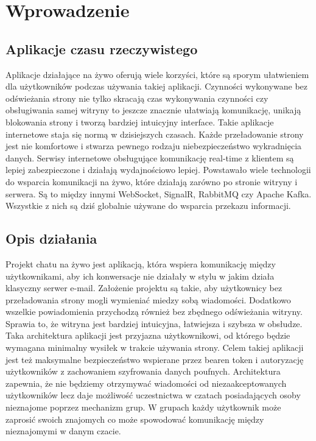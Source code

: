 \documentclass[10pt,a4paper]{article}
\begin{document}
\section{Wprowadzenie} 

\subsection{Aplikacje czasu rzeczywistego}
\hspace*{0.7cm} Aplikacje działające na żywo oferują wiele korzyści, które są sporym ułatwieniem dla użytkowników podczas używania takiej aplikacji. Czynności wykonywane
bez odświeżania strony nie tylko skracają czas wykonywania czynności czy obsługiwania samej witryny to jeszcze znacznie ułatwiają komunikację, unikają 
blokowania strony i tworzą bardziej intuicyjny interface. Takie aplikacje internetowe staja się normą w dzisiejszych czasach. Każde przeładowanie strony jest
nie komfortowe i stwarza pewnego rodzaju niebezpieczeństwo wykradnięcia danych. Serwisy internetowe obsługujące komunikację real-time z klientem są lepiej 
zabezpieczone i działają wydajnościowo lepiej. Powstawało wiele technologii do wsparcia komunikacji na żywo, które działają zarówno po stronie witryny i
serwera. Są to między innymi WebSocket, SignalR, RabbitMQ czy Apache Kafka. Wszystkie z nich są dziś globalnie używane do wsparcia przekazu informacji.

\subsection{Opis działania}
\hspace*{0.7cm} Projekt chatu na żywo jest aplikacją, która wspiera komunikację między użytkownikami, aby ich konwersacje nie działały w stylu w jakim działa klasyczny serwer
e-mail. Założenie projektu są takie, aby użytkownicy bez przeładowania strony mogli wymieniać miedzy sobą wiadomości. Dodatkowo wszelkie powiadomienia
przychodzą również bez zbędnego odświeżania witryny. Sprawia to, że witryna jest bardziej intuicyjna, łatwiejsza i szybsza w obsłudze. Taka architektura
aplikacji jest przyjazna użytkownikowi, od którego będzie wymagana minimalny wysiłek w trakcie używania strony. Celem takiej aplikacji jest też maksymalne 
bezpieczeństwo wspierane przez bearen token i autoryzację użytkowników z zachowaniem szyfrowania danych poufnych. Architektura zapewnia, że nie będziemy otrzymywać wiadomości od niezaakceptowanych użytkowników lecz daje możliwość uczestnictwa w czatach posiadających osoby nieznajome poprzez mechanizm grup. W grupach każdy użytkownik może zaprosić swoich znajomych co może spowodować komunikację między nieznajomymi w danym czacie.
\end{document}
